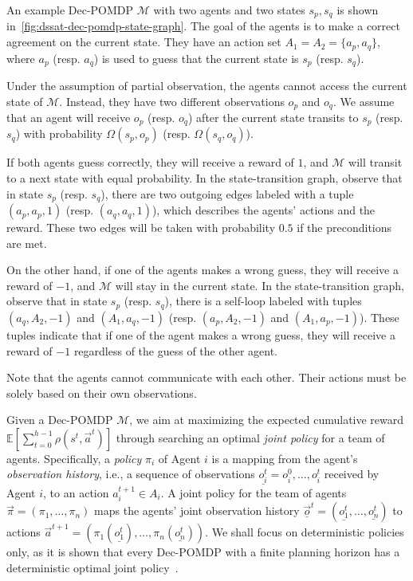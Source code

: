 \begin{example}
    An example Dec-POMDP $\mathcal{M}$ with two agents and two states $s_p,s_q$
    is shown in~\cref{fig:dssat-dec-pomdp-state-graph}.
    The goal of the agents is to make a correct agreement on the current state.
    They have an action set $A_1=A_2=\{a_p,a_q\}$,
    where $a_p$ (resp. $a_q$) is used to guess that the current state is $s_p$ (resp. $s_q$).

    Under the assumption of partial observation, the agents cannot access the current state of $\mathcal{M}$.
    Instead, they have two different observations $o_p$ and $o_q$.
    We assume that an agent will receive $o_p$ (resp. $o_q$) after the current state transits to $s_p$ (resp. $s_q$) with probability $\Omega(s_p,o_p)$ (resp. $\Omega(s_q,o_q)$).

    If both agents guess correctly, they will receive a reward of $1$,
    and $\mathcal{M}$ will transit to a next state with equal probability.
    In the state-transition graph, observe that in state $s_p$ (resp. $s_q$),
    there are two outgoing edges labeled with a tuple $(a_p,a_p,1)$ (resp. $(a_q,a_q,1)$),
    which describes the agents' actions and the reward.
    These two edges will be taken with probability $0.5$ if the preconditions are met.

    On the other hand, if one of the agents makes a wrong guess,
    they will receive a reward of $-1$, and $\mathcal{M}$ will stay in the current state.
    In the state-transition graph, observe that in state $s_p$ (resp. $s_q$),
    there is a self-loop labeled with tuples $(a_q,A_2,-1)$ and $(A_1,a_q,-1)$
    (resp. $(a_p,A_2,-1)$ and $(A_1,a_p,-1)$).
    These tuples indicate that if one of the agent makes a wrong guess,
    they will receive a reward of $-1$ regardless of the guess of the other agent.

    Note that the agents cannot communicate with each other.
    Their actions must be solely based on their own observations.
\end{example}

Given a Dec-POMDP $\mathcal{M}$,
we aim at maximizing the expected cumulative reward $\mathbb{E}[\sum_{t=0}^{h-1}\rho(s^t,\vec{a}^t)]$ through searching an optimal \textit{joint policy} for a team of agents.
Specifically, a \textit{policy} $\pi_i$ of Agent $i$ is a mapping from the agent's \textit{observation history},
i.e., a sequence of observations $\underline{o_i^t}=o_i^0,\ldots,o_i^t$ received by Agent $i$,
to an action $a_i^{t+1}\in A_i$.
A joint policy for the team of agents $\vec{\pi}=(\pi_1,\ldots,\pi_n)$ maps the agents' joint observation history $\vec{\underline{o}}^t=(\underline{o_1^t},\ldots,\underline{o_n^t})$ to actions $\vec{a}^{t+1}=(\pi_1(\underline{o_1^t}),\ldots,\pi_n(\underline{o_n^t}))$.
We shall focus on deterministic policies only,
as it is shown that every Dec-POMDP with a finite planning horizon has a deterministic optimal joint policy~\cite{Oliehoek2008}.

